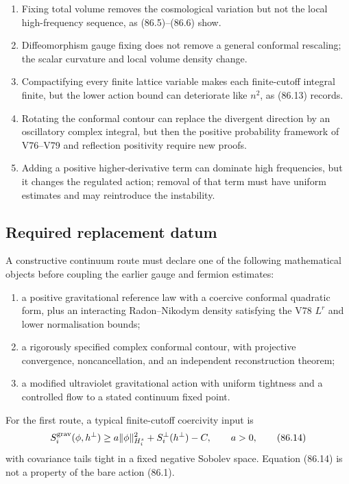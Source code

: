 \documentclass[11pt]{article}
\begin{document}
\begin{enumerate}
\item Fixing total volume removes the cosmological variation but not
      the local high-frequency sequence, as (86.5)--(86.6) show.
\item Diffeomorphism gauge fixing does not remove a general conformal
      rescaling; the scalar curvature and local volume density change.
\item Compactifying every finite lattice variable makes each
      finite-cutoff integral finite, but the lower action bound can
      deteriorate like \(n^2\), as (86.13) records.
\item Rotating the conformal contour can replace the divergent
      direction by an oscillatory complex integral, but then the
      positive probability framework of V76--V79 and reflection
      positivity require new proofs.
\item Adding a positive higher-derivative term can dominate high
      frequencies, but it changes the regulated action; removal of
      that term must have uniform estimates and may reintroduce the
      instability.
\end{enumerate}

\subsection{Required replacement datum}

A constructive continuum route must declare one of the following
mathematical objects before coupling the earlier gauge and fermion
estimates:
\begin{enumerate}
\item a positive gravitational reference law with a coercive
      conformal quadratic form, plus an interacting
      Radon--Nikodym density satisfying the V78 \(L^r\) and lower
      normalisation bounds;
\item a rigorously specified complex conformal contour, with
      projective convergence, noncancellation, and an independent
      reconstruction theorem;
\item a modified ultraviolet gravitational action with uniform
      tightness and a controlled flow to a stated continuum fixed
      point.
\end{enumerate}
For the first route, a typical finite-cutoff coercivity input is
\[
 S_i^{\rm grav}(\phi,h^\perp)
 \ge a\|\phi\|_{H^s_i}^2+S_i^\perp(h^\perp)-C,
                        \qquad a>0,                          \tag{86.14}
\]
with covariance tails tight in a fixed negative Sobolev space.
Equation (86.14) is not a property of the bare action (86.1).
\end{document}
